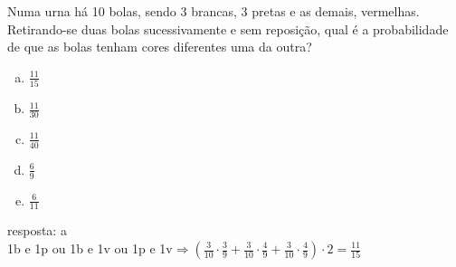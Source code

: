 \begin{ex}
 	Numa urna há 10 bolas, sendo 3 brancas, 3 pretas e as demais, vermelhas. Retirando-se duas bolas sucessivamente e sem reposição, qual é a probabilidade de que as bolas tenham cores diferentes uma da outra?
    \begin{enumerate}[(a)]
    \item $\frac{11}{15}$
    \item $\frac{11}{30}$
    \item $\frac{11}{40}$
    \item $\frac{6}{9}$
    \item $\frac{6}{11}$
    \end{enumerate}
      \begin{sol}
       resposta: a \\
       1b e 1p ou 1b e 1v ou 1p e 1v$ \Longrightarrow(\frac{3}{10}\cdot\frac{3}{9}+\frac{3}{10}\cdot\frac{4}{9}+\frac{3}{10}\cdot\frac{4}{9})\cdot2=\frac{11}{15}$
      \end{sol}
\end{ex}